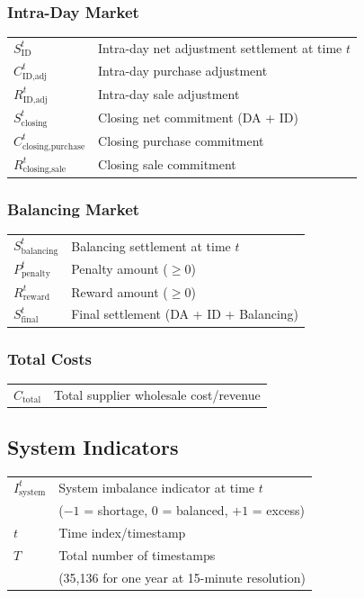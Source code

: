 \subsubsection{Intra-Day Market}

\begin{tabular}{ll}
$S_{\text{ID}}^{t}$ & Intra-day net adjustment settlement at time $t$ \\
$C_{\text{ID,adj}}^{t}$ & Intra-day purchase adjustment \\
$R_{\text{ID,adj}}^{t}$ & Intra-day sale adjustment \\
$S_{\text{closing}}^{t}$ & Closing net commitment (DA + ID) \\
$C_{\text{closing,purchase}}^{t}$ & Closing purchase commitment \\
$R_{\text{closing,sale}}^{t}$ & Closing sale commitment \\
\end{tabular}

\subsubsection{Balancing Market}

\begin{tabular}{ll}
$S_{\text{balancing}}^{t}$ & Balancing settlement at time $t$ \\
$P_{\text{penalty}}^{t}$ & Penalty amount ($\geq 0$) \\
$R_{\text{reward}}^{t}$ & Reward amount ($\geq 0$) \\
$S_{\text{final}}^{t}$ & Final settlement (DA + ID + Balancing) \\
\end{tabular}

\subsubsection{Total Costs}

\begin{tabular}{ll}
$C_{\text{total}}$ & Total supplier wholesale cost/revenue \\
\end{tabular}

\subsection{System Indicators}

\begin{tabular}{ll}
$I_{\text{system}}^{t}$ & System imbalance indicator at time $t$ \\
                        & ($-1$ = shortage, $0$ = balanced, $+1$ = excess) \\
$t$ & Time index/timestamp \\
$T$ & Total number of timestamps \\
   & (35,136 for one year at 15-minute resolution) \\
\end{tabular}

